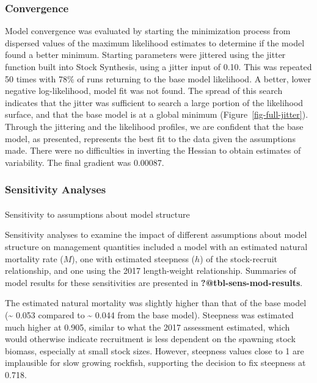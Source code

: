 \documentclass[
]{scrartcl}
\makeatletter
\let\oldparagraph\paragraph
\renewcommand{\paragraph}{
    \@ifstar
      \xxxParagraphStar
      \xxxParagraphNoStar
  }
\newcommand{\xxxParagraphStar}[1]{\oldparagraph*{#1}\mbox{}}
\newcommand{\xxxParagraphNoStar}[1]{\oldparagraph{#1}\mbox{}}
\makeatother
\begin{document}
\subsubsection{Convergence}\label{convergence}

Model convergence was evaluated by starting the minimization process
from dispersed values of the maximum likelihood estimates to determine
if the model found a better minimum. Starting parameters were jittered
using the jitter function built into Stock Synthesis, using a jitter
input of 0.10. This was repeated 50 times with 78\% of runs returning to
the base model likelihood. A better, lower negative log-likelihood,
model fit was not found. The spread of this search indicates that the
jitter was sufficient to search a large portion of the likelihood
surface, and that the base model is at a global minimum
(Figure~\ref{fig-full-jitter}). Through the jittering and the likelihood
profiles, we are confident that the base model, as presented, represents
the best fit to the data given the assumptions made. There were no
difficulties in inverting the Hessian to obtain estimates of
variability. The final gradient was 0.00087.

\subsubsection{Sensitivity Analyses}\label{sensitivity-analyses}

\paragraph{Sensitivity to assumptions about model
structure}\label{sensitivity-to-assumptions-about-model-structure}

Sensitivity analyses to examine the impact of different assumptions
about model structure on management quantities included a model with an
estimated natural mortality rate (\(M\)), one with estimated steepness
(\(h\)) of the stock-recruit relationship, and one using the 2017
length-weight relationship. Summaries of model results for these
sensitivities are presented in \textbf{?@tbl-sens-mod-results}.

The estimated natural mortality was slightly higher than that of the
base model (\textasciitilde{} 0.053 compared to \textasciitilde{} 0.044
from the base model). Steepness was estimated much higher at 0.905,
similar to what the 2017 assessment estimated, which would otherwise
indicate recruitment is less dependent on the spawning stock biomass,
especially at small stock sizes. However, steepness values close to 1
are implausible for slow growing rockfish, supporting the decision to
fix steepness at 0.718.
\end{document}
